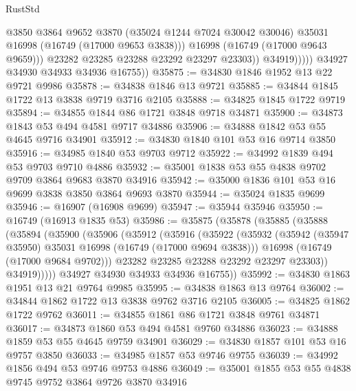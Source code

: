 \begin{lexlean}{RustStd}
\begin{coremodule}
                          @3850
                          @3864
                          @9652
                          @3870
                          (@35024 @1244 @7024 @30042 @30046)
                          @35031
                          @16998
                          (@16749 (@17000 @9653 @3838)))
                        @16998
                        (@16749 (@17000 @9643 @9659)))
                      @23282
                      @23285
                      @23288
                      @23292
                      @23297
                      @23303))
                  @34919)))))
        @34927
        @34930
        @34933
        @34936
        @16755))
@35875 := @34830 @1846 @1952 @13 @22 @9721 @9986
@35878 := @34838 @1846 @13 @9721
@35885 := @34844 @1845 @1722 @13 @3838 @9719 @3716 @2105
@35888 := @34825 @1845 @1722 @9719
@35894 := @34855 @1844 @86 @1721 @3848 @9718 @34871
@35900 := @34873 @1843 @53 @494 @4581 @9717 @34886
@35906 := @34888 @1842 @53 @55 @4645 @9716 @34901
@35912 := @34830 @1840 @101 @53 @16 @9714 @3850
@35916 := @34985 @1840 @53 @9703 @9712
@35922 := @34992 @1839 @494 @53 @9703 @9710 @4886
@35932 := @35001 @1838 @53 @55 @4838 @9702 @9709 @3864 @9683 @3870 @34916
@35942 := @35000 @1836 @101 @53 @16 @9699 @3838 @3850 @3864 @9693 @3870
@35944 := @35024 @1835 @9699
@35946 := @16907 (@16908 @9699)
@35947 := @35944 @35946
@35950 := @16749 (@16913 @1835 @53)
@35986 := @35875
    (@35878
      (@35885
        (@35888
          (@35894
            (@35900
              (@35906
                (@35912
                  (@35916
                    (@35922
                      (@35932
                        (@35942 (@35947 @35950) @35031 @16998 (@16749 (@17000 @9694 @3838)))
                        @16998
                        (@16749 (@17000 @9684 @9702)))
                      @23282
                      @23285
                      @23288
                      @23292
                      @23297
                      @23303))
                  @34919)))))
        @34927
        @34930
        @34933
        @34936
        @16755))
@35992 := @34830 @1863 @1951 @13 @21 @9764 @9985
@35995 := @34838 @1863 @13 @9764
@36002 := @34844 @1862 @1722 @13 @3838 @9762 @3716 @2105
@36005 := @34825 @1862 @1722 @9762
@36011 := @34855 @1861 @86 @1721 @3848 @9761 @34871
@36017 := @34873 @1860 @53 @494 @4581 @9760 @34886
@36023 := @34888 @1859 @53 @55 @4645 @9759 @34901
@36029 := @34830 @1857 @101 @53 @16 @9757 @3850
@36033 := @34985 @1857 @53 @9746 @9755
@36039 := @34992 @1856 @494 @53 @9746 @9753 @4886
@36049 := @35001 @1855 @53 @55 @4838 @9745 @9752 @3864 @9726 @3870 @34916

\end{coremodule}
\end{lexlean}
